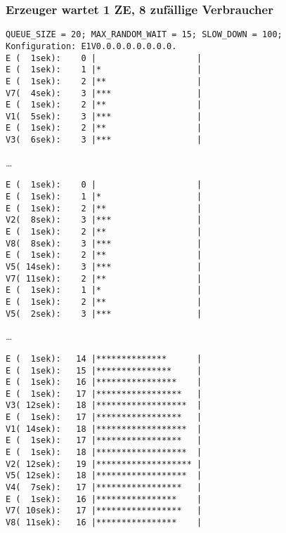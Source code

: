 \subsubsection{Erzeuger wartet 1 ZE, 8 zufällige Verbraucher} %
\label{sub:erzeuger_wartet_1_ze_8_zufallige_verbraucher}
\begin{quellcode}[H]
\begin{scriptsize}
\begin{spacing}{1.0}
\begin{verbatim}
QUEUE_SIZE = 20; MAX_RANDOM_WAIT = 15; SLOW_DOWN = 100;
Konfiguration: E1V0.0.0.0.0.0.0.0.
E (  1sek):    0 |                    |
E (  1sek):    1 |*                   |
E (  1sek):    2 |**                  |
V7(  4sek):    3 |***                 |
E (  1sek):    2 |**                  |
V1(  5sek):    3 |***                 |
E (  1sek):    2 |**                  |
V3(  6sek):    3 |***                 |
\end{verbatim}

…

\begin{verbatim}
E (  1sek):    0 |                    |
E (  1sek):    1 |*                   |
E (  1sek):    2 |**                  |
V2(  8sek):    3 |***                 |
E (  1sek):    2 |**                  |
V8(  8sek):    3 |***                 |
E (  1sek):    2 |**                  |
V5( 14sek):    3 |***                 |
V7( 11sek):    2 |**                  |
E (  1sek):    1 |*                   |
E (  1sek):    2 |**                  |
V5(  2sek):    3 |***                 |
\end{verbatim}

…

\begin{verbatim}
E (  1sek):   14 |**************      |
E (  1sek):   15 |***************     |
E (  1sek):   16 |****************    |
E (  1sek):   17 |*****************   |
V3( 12sek):   18 |******************  |
E (  1sek):   17 |*****************   |
V1( 14sek):   18 |******************  |
E (  1sek):   17 |*****************   |
E (  1sek):   18 |******************  |
V2( 12sek):   19 |******************* |
V5( 12sek):   18 |******************  |
V4(  7sek):   17 |*****************   |
E (  1sek):   16 |****************    |
V7( 10sek):   17 |*****************   |
V8( 11sek):   16 |****************    |
\end{verbatim}


\end{spacing}
\end{scriptsize}
\end{quellcode}
